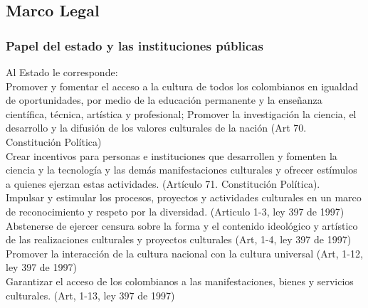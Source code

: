 \subsection{Marco Legal}
\subsubsection{Papel del estado y las instituciones públicas }
Al Estado le corresponde:\\

Promover y fomentar el acceso a la cultura de todos los colombianos en igualdad de
oportunidades, por medio de la educación permanente y la enseñanza científica,
técnica, artística y profesional; Promover la investigación la ciencia, el desarrollo y la
difusión de los valores culturales de la nación (Art 70. Constitución Política)\\

Crear incentivos para personas e instituciones que desarrollen y fomenten la ciencia y
la tecnología y las demás manifestaciones culturales y ofrecer estímulos a quienes
ejerzan estas actividades. (Artículo 71. Constitución Política).\\

Impulsar y estimular los procesos, proyectos y actividades culturales en un marco de
reconocimiento y respeto por la diversidad. (Articulo 1-3, ley 397 de 1997)\\

Abstenerse de ejercer censura sobre la forma y el contenido ideológico y artístico de
las realizaciones culturales y proyectos culturales (Art, 1-4, ley 397 de 1997) \\

Promover la interacción de la cultura nacional con la cultura universal (Art, 1-12, ley
397 de 1997)\\

Garantizar el acceso de los colombianos a las manifestaciones, bienes y servicios
culturales. (Art, 1-13, ley 397 de 1997) 
